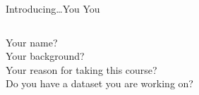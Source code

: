 \documentclass[handout]{beamer}
\begin{document}
\begin{frame}{Introducing\ldots \huge{You}}
	{\huge{You}}
	\small{}
	\begin{columns}
		Your name?\\
		Your background?\\
		Your reason for taking this course?\\
		Do you have a dataset you are working on?
	\end{columns}
\end{frame}
\end{document}
